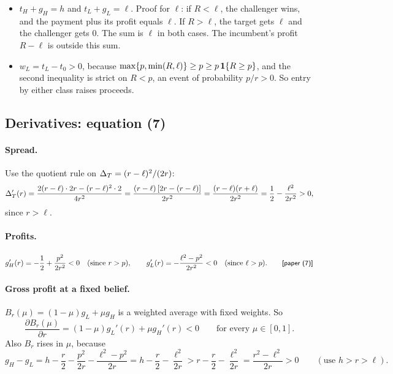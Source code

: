 \begin{panelnote}
\begin{itemize}
\item \(t_H+g_H=h\) and \(t_L+g_L=\ell\). Proof for \(\ell\): if \(R<\ell\), the challenger wins, and the
payment plus its profit equals \(\ell\). If \(R>\ell\), the target gets \(\ell\) and the challenger gets
\(0\). The sum is \(\ell\) in both cases. The incumbent's profit \(R-\ell\) is outside this sum.
\item \(w_L=t_L-t_0>0\), because \(\max\{p,\min(R,\ell)\}\ge p\ge p\,\mathbf{1}\{R\ge p\}\), and the second
inequality is strict on \(R<p\), an event of probability \(p/r>0\). So entry by either class raises
proceeds.
\end{itemize}
\end{panelnote}

\subsection{Derivatives: equation (7)}\label{sec:03_auction-derivatives}

\paragraph{Spread.} Use the quotient rule on \(\Delta_T=(r-\ell)^2/(2r)\):
\[
\Delta_T'(r)=\frac{2(r-\ell)\cdot2r-(r-\ell)^2\cdot2}{4r^2}=\frac{(r-\ell)\,[2r-(r-\ell)]}{2r^2}
=\frac{(r-\ell)(r+\ell)}{2r^2}=\frac12-\frac{\ell^2}{2r^2}>0,
\]
since \(r>\ell\).

\paragraph{Profits.}
\[
g_H'(r)=-\frac12+\frac{p^2}{2r^2}<0\quad(\text{since }r>p),\qquad
g_L'(r)=-\frac{\ell^2-p^2}{2r^2}<0\quad(\text{since }\ell>p). \tag*{\paper{(7)}}
\]

\paragraph{Gross profit at a fixed belief.} \(B_r(\mu)=(1-\mu)g_L+\mu g_H\) is a weighted average with
fixed weights. So
\[
\frac{\partial B_r(\mu)}{\partial r}=(1-\mu)g_L'(r)+\mu g_H'(r)<0\qquad\text{for every }\mu\in[0,1].
\]
Also \(B_r\) rises in \(\mu\), because
\[
g_H-g_L=h-\frac r2-\frac{p^2}{2r}-\frac{\ell^2-p^2}{2r}=h-\frac r2-\frac{\ell^2}{2r}
>r-\frac r2-\frac{\ell^2}{2r}=\frac{r^2-\ell^2}{2r}>0\qquad(\text{use }h>r>\ell).
\]

